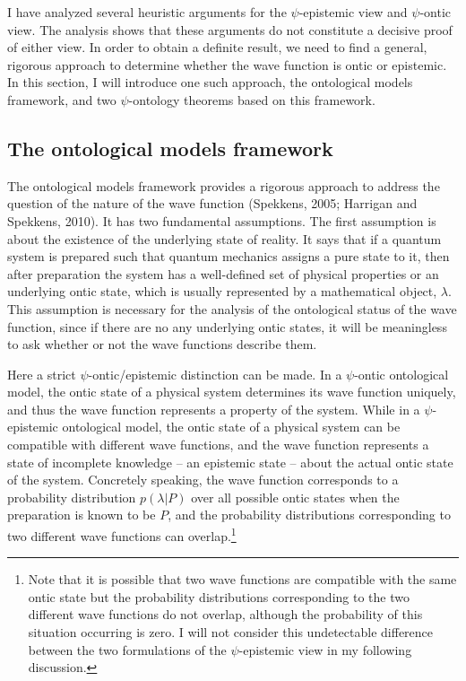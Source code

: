 I have analyzed several heuristic arguments for the $\psi$-epistemic view and $\psi$-ontic view. The analysis shows that these arguments do not constitute a decisive proof of either view. In order to obtain a definite result, we need to find a general, rigorous approach to determine whether the wave function is ontic or epistemic. In this section, I will introduce one such approach, the ontological models framework, and two $\psi$-ontology theorems based on this framework.

\subsection{The ontological models framework}

The ontological models framework provides a rigorous approach to address the question of the nature of the wave function (Spekkens, 2005; Harrigan and Spekkens, 2010). 
It has two fundamental assumptions. 
The first assumption is about the existence of the underlying state of reality. It says that if a quantum system is prepared such that quantum mechanics assigns a pure state to it, then after preparation the system has a well-defined set of physical properties or an underlying ontic state, which is usually represented by a mathematical object, $\lambda$. This assumption is necessary for the analysis of the ontological status of the wave function, since if there are no any underlying ontic states, it will be meaningless to ask whether or not the wave functions describe them. 

Here a strict $\psi$-ontic/epistemic distinction can be made. In a $\psi$-ontic ontological model, the ontic state of a physical system determines its wave function uniquely, and thus the wave function represents a  property of the system. While in a $\psi$-epistemic ontological model, the ontic state of a physical system can be compatible with different wave functions, and the wave function represents a state of incomplete knowledge -- an epistemic state -- about the actual ontic state of the system. Concretely speaking, the wave function corresponds to a probability distribution $p(\lambda|P)$ over all possible ontic states when the preparation is known to be $P$, and the probability distributions corresponding to two different wave functions can overlap.\footnote{Note that it is possible that two wave functions are compatible with the same ontic state but the probability distributions corresponding to the two different wave functions do not overlap, although the probability of this situation occurring is zero. I will not consider this undetectable difference between the two formulations of the $\psi$-epistemic view in my following discussion.} %

